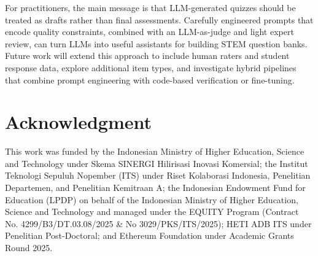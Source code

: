 \documentclass[a4paper,conference]{IEEEtran}
\begin{document}
For practitioners, the main message is that LLM-generated quizzes should be treated as drafts rather than final assessments. Carefully engineered prompts that encode quality constraints, combined with an LLM-as-judge and light expert review, can turn LLMs into useful assistants for building STEM question banks. Future work will extend this approach to include human raters and student response data, explore additional item types, and investigate hybrid pipelines that combine prompt engineering with code-based verification or fine-tuning.

\section*{Acknowledgment}

This work was funded by the Indonesian Ministry of Higher Education, Science and Technology under Skema SINERGI Hilirisasi Inovasi Komersial; the Institut Teknologi Sepuluh Nopember (ITS) under Riset Kolaborasi Indonesia, Penelitian Departemen, and Penelitian Kemitraan A; the Indonesian Endowment Fund for Education (LPDP) on behalf of the Indonesian Ministry of Higher Education, Science and Technology and managed under the EQUITY Program (Contract No. 4299/B3/DT.03.08/2025 \& No 3029/PKS/ITS/2025); HETI ADB ITS under Penelitian Post-Doctoral; and Ethereum Foundation under Academic Grants Round 2025.



\end{document}
